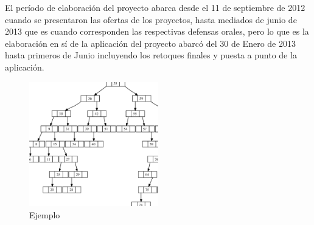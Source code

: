 El período de elaboración del proyecto abarca desde el 11 de septiembre de 2012 cuando se presentaron las ofertas de los proyectos, 
hasta mediados de junio de 2013 que es cuando corresponden las respectivas defensas orales, pero lo que es la elaboración en sí de la aplicación del proyecto
abarcó del 30 de Enero de 2013 hasta primeros de Junio incluyendo los retoques finales y puesta a punto de la aplicación.
\begin{figure}[!th]
\begin{center}
\includegraphics[width=0.5\textwidth]{images/arbolbinario.eps}
\caption{Ejemplo}
\label{fig:ArbolBinario}
\end{center}
\end{figure}

